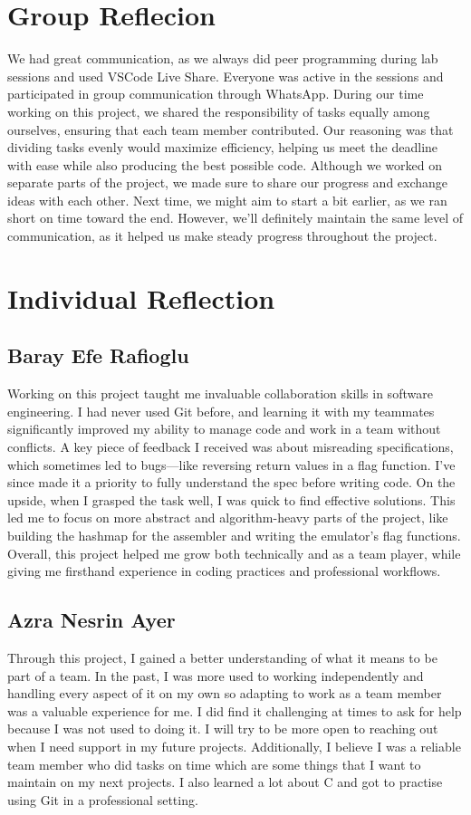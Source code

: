 \documentclass{article}
\begin{document}
\section{Group Reflecion}
We had great communication, as we always did peer programming during lab sessions and used VSCode Live Share. Everyone was active in the sessions and participated in group communication through WhatsApp. During our time working on this project, we shared the responsibility of tasks equally among ourselves, ensuring that each team member contributed. Our reasoning was that dividing tasks evenly would maximize efficiency, helping us meet the deadline with ease while also producing the best possible code. Although we worked on separate parts of the project, we made sure to share our progress and exchange ideas with each other. Next time, we might aim to start a bit earlier, as we ran short on time toward the end. However, we’ll definitely maintain the same level of communication, as it helped us make steady progress throughout the project.



\section{Individual Reflection}
\subsection{Baray Efe Rafioglu}
Working on this project taught me invaluable collaboration skills in software engineering. I had never used Git before, and learning it with my teammates significantly improved my ability to manage code and work in a team without conflicts. A key piece of feedback I received was about misreading specifications, which sometimes led to bugs—like reversing return values in a flag function. I’ve since made it a priority to fully understand the spec before writing code. On the upside, when I grasped the task well, I was quick to find effective solutions. This led me to focus on more abstract and algorithm-heavy parts of the project, like building the hashmap for the assembler and writing the emulator’s flag functions. Overall, this project helped me grow both technically and as a team player, while giving me firsthand experience in coding practices and professional workflows.


\subsection{Azra Nesrin Ayer} 
Through this project, I gained a better understanding of what it means to be part of a team. In the past, I was more used to working independently and handling every aspect of it on my own so adapting to work as a team member was a valuable experience for me. I did find it challenging at times to ask for help because I was not used to doing it. I will try to be more open to reaching out when I need support in my future projects. Additionally, I believe I was a reliable team member who did tasks on time which are some things that I want to maintain on my next projects. I also learned a lot about C and got to practise using Git in a professional setting.
\end{document}

